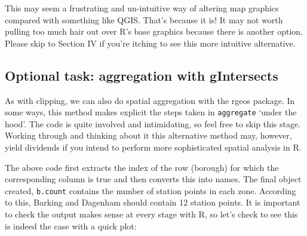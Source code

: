 \documentclass[]{article}
\newenvironment{Shaded}{}{}
\newcommand{\KeywordTok}[1]{\textcolor[rgb]{0.00,0.44,0.13}{\textbf{{#1}}}}
\newcommand{\DataTypeTok}[1]{\textcolor[rgb]{0.56,0.13,0.00}{{#1}}}
\newcommand{\DecValTok}[1]{\textcolor[rgb]{0.25,0.63,0.44}{{#1}}}
\newcommand{\StringTok}[1]{\textcolor[rgb]{0.25,0.44,0.63}{{#1}}}
\newcommand{\CommentTok}[1]{\textcolor[rgb]{0.38,0.63,0.69}{\textit{{#1}}}}
\newcommand{\OtherTok}[1]{\textcolor[rgb]{0.00,0.44,0.13}{{#1}}}
\newcommand{\NormalTok}[1]{{#1}}
\begin{document}
This may seem a frustrating and un-intuitive way of altering map
graphics compared with something like QGIS. That's because it is! It may
not worth pulling too much hair out over R's base graphics because there
is another option. Please skip to Section IV if you're itching to see
this more intuitive alternative.

\subsection{Optional task: aggregation with
gIntersects}\label{optional-task-aggregation-with-gintersects}

As with clipping, we can also do spatial aggregation with the rgeos
package. In some ways, this method makes explicit the steps taken in
\texttt{aggregate} `under the hood'. The code is quite involved and
intimidating, so feel free to skip this stage. Working through and
thinking about it this alternative method may, however, yield dividends
if you intend to perform more sophisticated spatial analysis in R.

\begin{Shaded}
\end{Shaded}

The above code first extracts the index of the row (borough) for which
the corresponding column is true and then converts this into names. The
final object created, \texttt{b.count} contains the number of station
points in each zone. According to this, Barking and Dagenham should
contain 12 station points. It is important to check the output makes
sense at every stage with R, so let's check to see this is indeed the
case with a quick plot:
\end{document}
